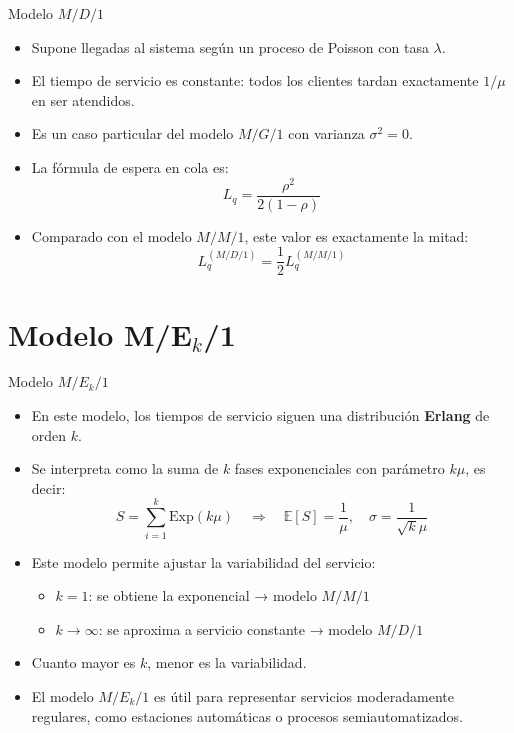 \documentclass{beamer}
\begin{document}
\begin{frame}{Modelo \texorpdfstring{$M/D/1$}{M/D/1}}
  \begin{itemize}
    \item Supone llegadas al sistema según un proceso de Poisson con tasa \( \lambda \). \pause

    \item El tiempo de servicio es constante: todos los clientes tardan exactamente \( 1/\mu \) en ser atendidos. \pause

    \item Es un caso particular del modelo \( M/G/1 \) con varianza \( \sigma^2 = 0 \). \pause

    \item La fórmula de espera en cola es:
    \[
    L_q = \frac{\rho^2}{2(1 - \rho)}
    \] \pause

    \item Comparado con el modelo \( M/M/1 \), este valor es exactamente la mitad:
    \[
    L_q^{(M/D/1)} = \frac{1}{2} L_q^{(M/M/1)}
    \]
  \end{itemize}
\end{frame}


\section*{Modelo M/E$_k$/1}

\begin{frame}{Modelo \texorpdfstring{$M/E_k/1$}{M/Ek/1}}
  \begin{itemize}
    \item En este modelo, los tiempos de servicio siguen una distribución \textbf{Erlang} de orden \( k \). \pause

    \item Se interpreta como la suma de \( k \) fases exponenciales con parámetro \( k\mu \), es decir:
    \[
    S = \sum_{i=1}^{k} \text{Exp}(k\mu) \quad \Rightarrow \quad \mathbb{E}[S] = \frac{1}{\mu}, \quad \sigma = \frac{1}{\sqrt{k} \mu}
    \] \pause

    \item Este modelo permite ajustar la variabilidad del servicio:
    \begin{itemize}
      \item \( k = 1 \): se obtiene la exponencial → modelo \( M/M/1 \) \pause
      \item \( k \to \infty \): se aproxima a servicio constante → modelo \( M/D/1 \) \pause
    \end{itemize}

    \item Cuanto mayor es \( k \), menor es la variabilidad. \pause

    \item El modelo \( M/E_k/1 \) es útil para representar servicios moderadamente regulares, como estaciones automáticas o procesos semiautomatizados.
  \end{itemize}
\end{frame}
\end{document}
